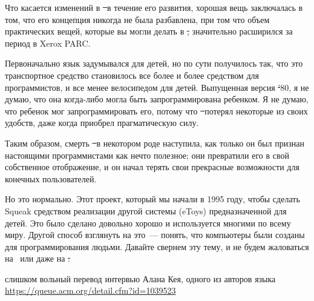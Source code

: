 Что касается изменений в \st\ в течение его развития, хорошая вещь заключалась в том, 
что его концепция никогда не была разбавлена, при том что объем практических вещей, 
которые вы могли делать в \st, значительно расширился за период в Xerox PARC.

Первоначально язык задумывался для детей, но по сути получилось так, что это 
транспортное средство становилось все более и более средством для программистов,
и все менее велосипедом для детей. Выпущенная версия \st'80, я не думаю, 
что она когда-либо могла быть запрограммирована ребенком. 
Я не думаю, что ребенок мог запрограммировать его, потому что \st\ потерял
некоторые из своих удобств, даже когда приобрел прагматическую силу.

Таким образом, смерть \st\ в некотором роде наступила, как только он был 
признан настоящими программистами как нечто полезное; они превратили его 
в свой собственное отображение, и он начал терять свои прекрасные 
возможности для конечных пользователей.

Но это нормально. Этот проект, который мы начали в 1995 году, чтобы сделать Squeak 
средством реализации другой системы (eToys) предназначенной для детей.
Это было сделано довольно хорошо и используется многими по всему миру.
Другой способ взглянуть на это\ --- понять, что компьютеры были созданы для программирования людьми.
Давайте свернем эту тему, и не будем жаловаться на \java\ или даже на \st.

\vspace{1cm}\noindent
слишком вольный перевод
интервью Алана Кея, одного из авторов языка \st\\
\url{https://queue.acm.org/detail.cfm?id=1039523}
